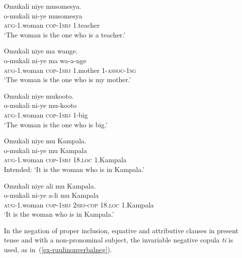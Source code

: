 \ea \label{ex-ruulini}
\begin{xlist}
	\ex \label{ex-ruulini1}
	\glll Omukali niye musomesya.\\
	  o-mukali ni-ye musomesya\\
		\textsc{aug}-1.woman \textsc{cop}-\textsc{1sbj} 1.teacher\\
	\glt ‘The woman is the one who is a teacher.’ 

\ex \label{ex-ruulini2}
	\glll Omukali niye ma wange.\\
	  o-mukali ni-ye ma wa-a-nge\\
		\textsc{aug}-1.woman \textsc{cop}-\textsc{1sbj} 1.mother 1-\textsc{assoc}-\textsc{1sg}\\
	\glt ‘The woman is the one who is my mother.’ 	

\ex \label{ex-ruulini3}
	\glll Omukali niye mukooto.\\
	  o-mukali ni-ye mu-kooto\\
		\textsc{aug}-1.woman \textsc{cop}-\textsc{1sbj} 1-big\\
\glt ‘The woman is the one who is big.’

\ex \label{ex-ruulini4}
	\glll *Omukali niye mu Kampala.\\
		o-mukali ni-ye mu Kampala\\
		\textsc{aug}-1.woman \textsc{cop}-\textsc{1sbj} 18.\textsc{loc} 1.Kampala\\
\glt Intended: ‘It is the woman who is in Kampala.’

\ex \label{ex-ruulini5}
	\glll Omukali niye ali mu Kampala.\\
	 o-mukali ni-ye a-li mu Kampala\\
		\textsc{aug}-1.woman \textsc{cop}-\textsc{1sbj} \textsc{2sbj}-\textsc{cop} 18.\textsc{loc} 1.Kampala\\
\glt ‘It is the woman who is in Kampala.’
\end{xlist}
\z

In the negation of proper inclusion, equative and attributive clauses in present tense and with a non-pronominal subject, the invariable negative copula \textit{ti} is used, as in~(\ref{ex-ruulinonverbalneg}). 

